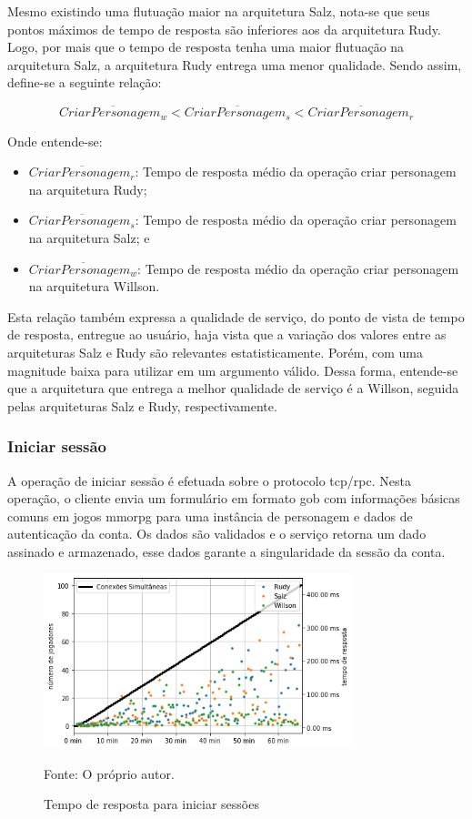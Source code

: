 Mesmo existindo uma flutuação maior na arquitetura Salz, nota-se que seus pontos máximos de tempo de resposta são inferiores aos da arquitetura Rudy.
%
Logo, por mais que o tempo de resposta tenha uma maior flutuação na arquitetura Salz, a arquitetura Rudy entrega uma menor qualidade.
%
Sendo assim, define-se a seguinte relação:

$$
  \overline{CriarPersonagem_{w}} < \overline{CriarPersonagem_{s}} <\overline{CriarPersonagem_{r}}
$$

Onde entende-se:

\begin{itemize}
 \item $\overline{CriarPersonagem_{r}}$: Tempo de resposta médio da operação criar personagem na arquitetura Rudy;
 \item $\overline{CriarPersonagem_{s}}$: Tempo de resposta médio da operação criar personagem na arquitetura Salz; e
 \item $\overline{CriarPersonagem_{w}}$: Tempo de resposta médio da operação criar personagem na arquitetura Willson.
\end{itemize}

Esta relação também expressa a qualidade de serviço, do ponto de vista de tempo de resposta, entregue ao usuário, haja vista que a variação dos valores entre as arquiteturas Salz e Rudy são relevantes estatisticamente.
%
Porém, com uma magnitude baixa para utilizar em um argumento válido.
%
Dessa forma, entende-se que a arquitetura que entrega a melhor qualidade de serviço é a Willson, seguida pelas arquiteturas Salz e Rudy, respectivamente.



\subsubsection{Iniciar sessão}
\label{sec:op_start_session}
A operação de iniciar sessão é efetuada sobre o protocolo \ac{tcp}/\ac{rpc}.
%
Nesta operação, o cliente envia um formulário em formato \ac{gob} com informações básicas comuns em jogos \ac{mmorpg} para uma instância de personagem e dados de autenticação da conta.
%
Os dados são validados e o serviço retorna um dado assinado e armazenado, esse dados garante a singularidade da sessão da conta.

\begin{figure}[htb!]
  \caption{Tempo de resposta para iniciar sessões}
  \label{fig:start_session_request_time}
  \includegraphics[width=0.8\textwidth]{figuras/analise/rt/start_session_request_time.png}
  \centering

  Fonte: O próprio autor.
\end{figure}

